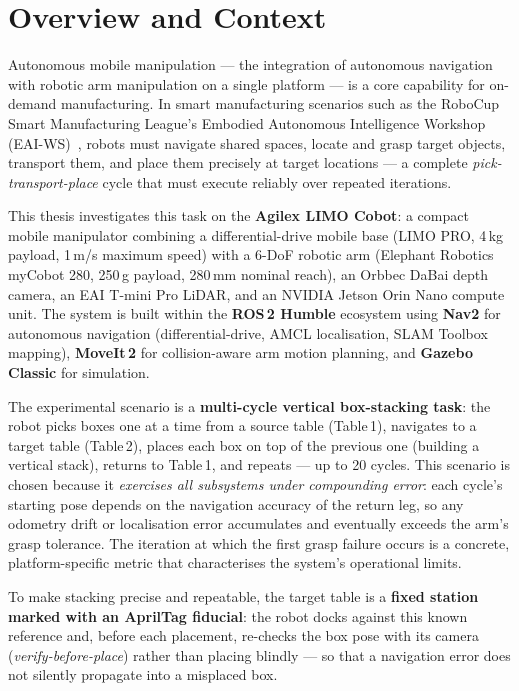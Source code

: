 \documentclass[11pt,a4paper]{article}
\begin{document}
\vspace{0.5em}

\section{Overview and Context}

Autonomous mobile manipulation --- the integration of autonomous navigation with robotic
arm manipulation on a single platform --- is a core capability for on-demand
manufacturing. In smart manufacturing scenarios such as the RoboCup Smart Manufacturing
League's Embodied Autonomous Intelligence Workshop (EAI-WS)~\cite{masannek2026eaiws},
robots must navigate shared spaces, locate and grasp target objects, transport them, and
place them precisely at target locations --- a complete \emph{pick-transport-place}
cycle that must execute reliably over repeated iterations.

This thesis investigates this task on the \textbf{Agilex LIMO Cobot}: a compact
mobile manipulator combining a differential-drive mobile base (LIMO PRO, 4\,kg
payload, 1\,m/s maximum speed) with a 6-DoF robotic arm (Elephant Robotics myCobot
280, 250\,g payload, 280\,mm nominal reach), an Orbbec DaBai depth camera, an EAI
T-mini Pro LiDAR, and an NVIDIA Jetson Orin Nano compute unit. The system is built
within the \textbf{ROS\,2 Humble} ecosystem using \textbf{Nav2} for autonomous
navigation (differential-drive, AMCL localisation, SLAM Toolbox mapping),
\textbf{MoveIt\,2} for collision-aware arm motion planning, and \textbf{Gazebo
Classic} for simulation.

The experimental scenario is a \textbf{multi-cycle vertical box-stacking task}: the
robot picks boxes one at a time from a source table (Table\,1), navigates to a target
table (Table\,2), places each box on top of the previous one (building a vertical
stack), returns to Table\,1, and repeats --- up to 20 cycles. This scenario is chosen
because it \emph{exercises all subsystems under compounding error}: each cycle's
starting pose depends on the navigation accuracy of the return leg, so any odometry
drift or localisation error accumulates and eventually exceeds the arm's grasp
tolerance. The iteration at which the first grasp failure occurs is a concrete,
platform-specific metric that characterises the system's operational limits.

To make stacking precise and repeatable, the target table is a \textbf{fixed station
marked with an AprilTag fiducial}: the robot docks against this known reference and,
before each placement, re-checks the box pose with its camera (\emph{verify-before-place})
rather than placing blindly --- so that a navigation error does not silently propagate
into a misplaced box.
\end{document}
